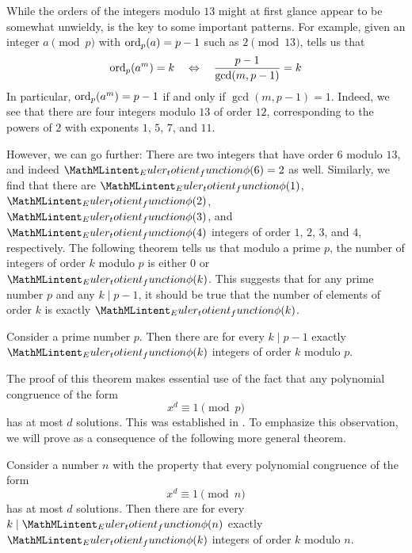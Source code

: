 While the orders of the integers modulo $13$ might at first glance appear to be somewhat unwieldy,  is the key to some important patterns. For example, given an integer $a\pmod{p}$ with $\operatorname{ord}_p(a)=p-1$ such as $2\pmod{13}$,  tells us that
\begin{equation*}
  \operatorname{ord}_p(a^m)=k \quad\Leftrightarrow\quad \frac{p-1}{\gcd(m,p-1)}=k
\end{equation*}
In particular, $\operatorname{ord}_p(a^m)=p-1$ if and only if $\gcd(m,p-1)=1$. Indeed, we see that there are four integers modulo $13$ of order $12$, corresponding to the powers of $2$ with exponents $1$, $5$, $7$, and $11$.

However, we can go further: There are two integers that have order $6$ modulo $13$, and indeed $\totient(6)=2$ as well. Similarly, we find that there are $\totient(1)$, $\totient(2)$, $\totient(3)$, and $\totient(4)$ integers of order $1$, $2$, $3$, and $4$, respectively. The following theorem tells us that modulo a prime $p$, the number of integers of order $k$ modulo $p$ is either $0$ or $\totient(k)$. This suggests that for any prime number $p$ and any $k\mid p-1$, it should be true that the number of elements of order $k$ is exactly $\totient(k)$.

\begin{theorem}\label{theorem:count-integers-of-order-mod-prime}
  Consider a prime number $p$. Then there are for every $k\mid p-1$ exactly $\totient(k)$ integers of order $k$ modulo $p$.
\end{theorem}

The proof of this theorem makes essential use of the fact that any polynomial congruence of the form
\begin{equation*}
  x^d\equiv 1\pmod{p}
\end{equation*}
has at most $d$ solutions. This was established in . To emphasize this observation, we will prove  as a consequence of the following more general theorem.

\begin{theorem}\label{theorem:count-integers-of-order}
  Consider a number $n$ with the property that every polynomial congruence of the form
  \begin{equation*}
    x^d\equiv 1\pmod{n}
  \end{equation*}
  has at most $d$ solutions. Then there are for every $k\mid\totient(n)$ exactly $\totient(k)$ integers of order $k$ modulo $n$.
\end{theorem}

